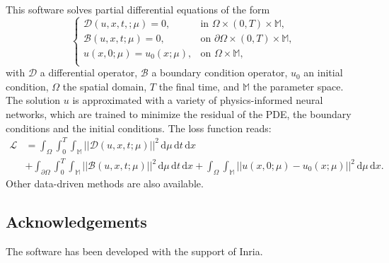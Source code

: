 
This software solves partial differential equations of the form
\begin{equation*}
    \begin{cases}
        \mathcal{D}(u, x, t,; \mu) = 0,
         & \text{in } \Omega \times (0,T) \times \mathbb{M},          \\
        \mathcal{B}(u, x, t; \mu) = 0,
         & \text{on } \partial \Omega \times (0,T) \times \mathbb{M}, \\
        u(x, 0; \mu) = u_0(x; \mu),
         & \text{on } \Omega \times \mathbb{M},                       \\
    \end{cases}
\end{equation*}
with $\mathcal{D}$ a differential operator, $\mathcal{B}$ a boundary condition operator,
$u_0$ an initial condition, $\Omega$ the spatial domain,
$T$ the final time, and $\mathbb{M}$ the parameter space.
The solution $u$ is approximated with a variety of physics-informed neural networks,
which are trained to minimize the residual of the PDE,
the boundary conditions and the initial conditions.
The loss function reads:
\begin{equation*}
    \begin{aligned}
    \mathcal{L} & =
    \int_\Omega \int_0^T \int_{\mathbb{M}}
    ||\mathcal{D}(u, x, t; \mu)||^2 \,
    \mathrm{d}\mu \, \mathrm{d}t \, \mathrm{d}x \\
    & +
    \int_{\partial\Omega} \int_0^T \int_{\mathbb{M}}
    ||\mathcal{B}(u, x, t; \mu)||^2 \,
    \mathrm{d}\mu \, \mathrm{d}t \, \mathrm{d}x
    +
    \int_{\Omega} \int_{\mathbb{M}}
    ||u(x, 0; \mu) - u_0(x;\mu)||^2 \,
    \mathrm{d}\mu \, \mathrm{d}x.
    \end{aligned}
\end{equation*}
Other data-driven methods are also available.




\subsection{Acknowledgements}
\label{sec::Scimba:acknowledgements}

The software has been developed with the support of Inria.

